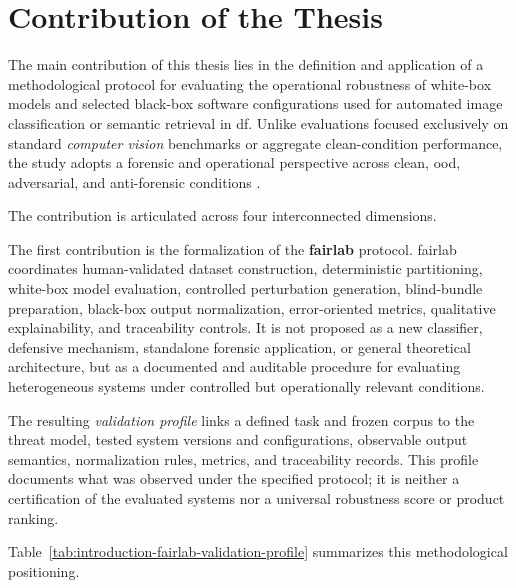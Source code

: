 \section{Contribution of the Thesis}

The main contribution of this thesis lies in the definition and application of
a methodological protocol for evaluating the operational robustness of
white-box models and selected black-box software configurations used for
automated image classification or semantic retrieval in \gls{df}. Unlike
evaluations focused exclusively on standard \textit{computer vision} benchmarks
or aggregate clean-condition performance, the study adopts a forensic and
operational perspective across clean, \gls{ood}, adversarial, and anti-forensic
conditions
\cite{nowroozi2020phd,hendrycks2019benchmarking,sanna2024preliminary,sanna2025pixelperfect}.

The contribution is articulated across four interconnected dimensions.

The first contribution is the formalization of the \textbf{\gls{fairlab}}
protocol. \gls{fairlab} coordinates human-validated dataset construction,
deterministic partitioning, white-box model evaluation, controlled
perturbation generation, blind-bundle preparation, black-box output
normalization, error-oriented metrics, qualitative explainability, and
traceability controls. It is not proposed as a new classifier, defensive
mechanism, standalone forensic application, or general theoretical architecture,
but as a documented and auditable procedure for evaluating heterogeneous
systems under controlled but operationally relevant conditions.

The resulting \textit{validation profile} links a defined task and frozen
corpus to the threat model, tested system versions and configurations,
observable output semantics, normalization rules, metrics, and traceability
records. This profile documents what was observed under the specified
protocol; it is neither a certification of the evaluated systems nor a
universal robustness score or product ranking.

Table~\ref{tab:introduction-fairlab-validation-profile} summarizes this
methodological positioning.

